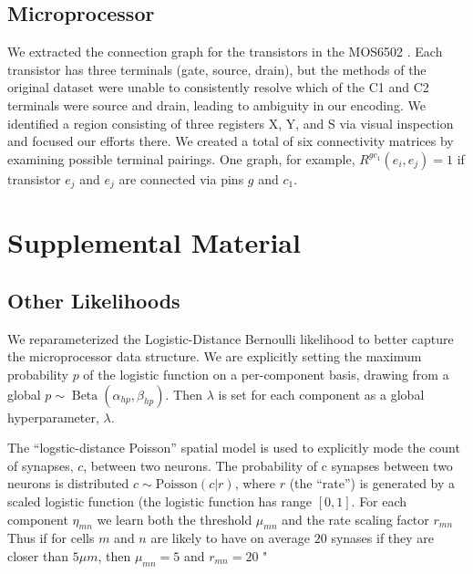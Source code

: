 \documentclass{article}
\begin{document}
\subsection*{Microprocessor}
We extracted the connection graph for the transistors in the MOS6502
\autocite{visual6502source}. Each transistor has three terminals (gate,
source, drain), but the methods of the original dataset were unable to
consistently resolve which of the C1 and C2 terminals were source and
drain, leading to ambiguity in our encoding. We identified a region
consisting of three registers X, Y, and S via visual
inspection and focused our efforts there. We created a total of six
connectivity matrices by examining possible terminal pairings. One
graph, for example, $R^{gc_1}(e_i, e_j)=1$ if transistor $e_j$ and
$e_j$ are connected via pins $g$ and $c_1$. 


\newpage
\section*{Supplemental Material}

\subsection*{Other Likelihoods}
\label{supp:otherlikelihoods}

We reparameterized the Logistic-Distance Bernoulli likelihood to
better capture the microprocessor data structure. We are explicitly
setting the maximum probability $p$ of the logistic function on a
per-component basis, drawing from a global $p \sim \operatorname{Beta}(\alpha_{hp},
\beta_{hp})$. Then $\lambda$ is set for each component as a global
hyperparameter, $\lambda$.

The ``logstic-distance Poisson'' spatial model is used to explicitly
mode the count of synapses, $c$, between two neurons. The probability
of c synapses between two neurons is distributed $c \sim
\textrm{Poisson}(c | r)$, where $r$ (the ``rate'') is generated by a
scaled logistic function (the logistic function has range $[0,
1]$. For each component $\eta_{mn}$ we learn both the threshold
$\mu_{mn}$ and the rate scaling factor $r_{mn}$ Thus if for cells $m$
and $n$ are likely to have on average $20$ synases if they are closer
than $5 \mu m$, then $\mu_{mn} = 5$ and $r_{mn} = 20$ "
\end{document}

